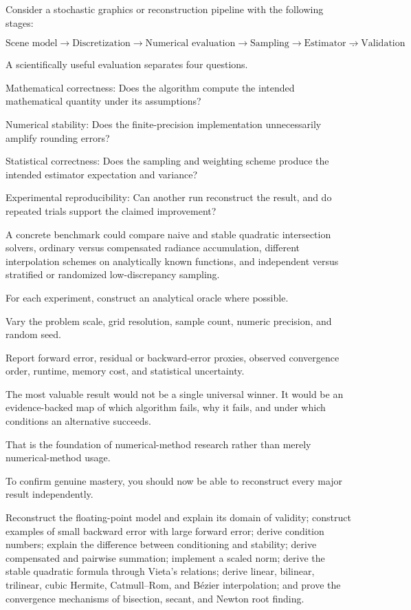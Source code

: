 Consider a stochastic graphics or reconstruction pipeline with the following stages:

\[ \boxed{ \text{Scene model} \rightarrow \text{Discretization} \rightarrow \text{Numerical evaluation} \rightarrow \text{Sampling} \rightarrow \text{Estimator} \rightarrow \text{Validation} }. \]

A scientifically useful evaluation separates four questions.

Mathematical correctness: Does the algorithm compute the intended mathematical quantity under its assumptions?

Numerical stability: Does the finite-precision implementation unnecessarily amplify rounding errors?

Statistical correctness: Does the sampling and weighting scheme produce the intended estimator expectation and variance?

Experimental reproducibility: Can another run reconstruct the result, and do repeated trials support the claimed improvement?

A concrete benchmark could compare naive and stable quadratic intersection solvers, ordinary versus compensated radiance accumulation, different interpolation schemes on analytically known functions, and independent versus stratified or randomized low-discrepancy sampling.

For each experiment, construct an analytical oracle where possible.

Vary the problem scale, grid resolution, sample count, numeric precision, and random seed.

Report forward error, residual or backward-error proxies, observed convergence order, runtime, memory cost, and statistical uncertainty.

The most valuable result would not be a single universal winner. It would be an evidence-backed map of which algorithm fails, why it fails, and under which conditions an alternative succeeds.

That is the foundation of numerical-method research rather than merely numerical-method usage.

To confirm genuine mastery, you should now be able to reconstruct every major result independently.

Reconstruct the floating-point model and explain its domain of validity; construct examples of small backward error with large forward error; derive condition numbers; explain the difference between conditioning and stability; derive compensated and pairwise summation; implement a scaled norm; derive the stable quadratic formula through Vieta's relations; derive linear, bilinear, trilinear, cubic Hermite, Catmull--Rom, and Bézier interpolation; and prove the convergence mechanisms of bisection, secant, and Newton root finding.


